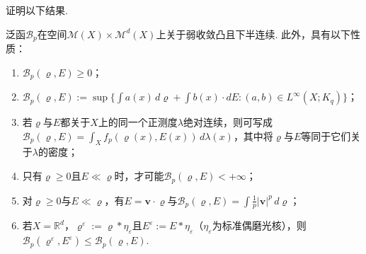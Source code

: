 证明以下结果.

\begin{proposition}\label{obj:5.18}
泛函$\mathscr B_p$在空间$\mathscr M(X)\times\mathscr M^d(X)$上关于弱收敛凸且下半连续. 此外，具有以下性质：
\begin{enumerate}
\item $\mathscr B_p(\varrho,E)\ge0$；
\item $\mathscr B_p(\varrho,E):=\sup\{\int a(x)\,d\varrho+\int b(x)\cdot dE:(a,b)\in L^\infty(X;K_q)\}$；
\item 若$\varrho$与$E$都关于$X$上的同一个正测度$\lambda$绝对连续，则可写成$\mathscr B_p(\varrho,E)=\int_Xf_p(\varrho(x),E(x))\,d\lambda(x)$，其中将$\varrho$与$E$等同于它们关于$\lambda$的密度；
\item 只有$\varrho\ge0$且$E\ll\varrho$时，才可能$\mathscr B_p(\varrho,E)<+\infty$；
\item 对$\varrho\ge0$与$E\ll\varrho$，有$E=\mathbf v\cdot\varrho$与$\mathscr B_p(\varrho,E)=\int\frac1p|\mathbf v|^p\,d\varrho$；
\item 若$X=\mathbb R^d$，$\varrho^\varepsilon:=\varrho*\eta_\varepsilon$且$E^\varepsilon:=E*\eta_\varepsilon$（$\eta_\varepsilon$为标准偶磨光核），则$\mathscr B_p(\varrho^\varepsilon,E^\varepsilon)\le\mathscr B_p(\varrho,E)$.
\end{enumerate}
\end{proposition}
